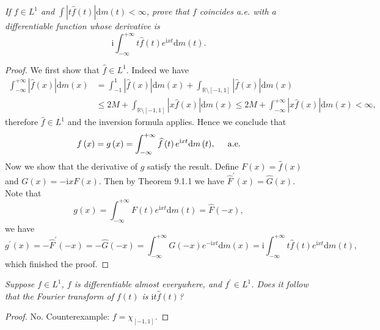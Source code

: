 \begin{problem}\em
If $f\in L^1$ and $\int|t\widehat{f}(t)|\mathrm{d}m(t)<\infty$, prove that $f$ coincides a.e. with a differentiable function whose derivative is 
$$\mathrm{i}\int_{-\infty}^{+\infty}t\widehat{f}(t)e^{\mathrm{i}xt}\mathrm{d}m(t).$$
\end{problem}
\begin{proof}
We first show that $\widehat{f}\in L^1$. Indeed we have 
$$
\begin{aligned}
\int_{-\infty}^{+\infty}{\left| \widehat{f}\left( x \right) \right|\mathrm{d}m\left( x \right)}&=\int_{-1}^1{\left| \widehat{f}\left( x \right) \right|\mathrm{d}m\left( x \right)}+\int_{\mathbb{R} \setminus \left[ -1,1 \right]}{\left| \widehat{f}\left( x \right) \right|\mathrm{d}m\left( x \right)}
\\
&\le 2M+\int_{\mathbb{R} \setminus \left[ -1,1 \right]}{\left| x\widehat{f}\left( x \right) \right|\mathrm{d}m\left( x \right)}\le 2M+\int_{-\infty}^{+\infty}{\left| x\widehat{f}\left( x \right) \right|\mathrm{d}m\left( x \right)}<\infty ,
\end{aligned}
$$
therefore $\widehat{f}\in L^1$ and the inversion formula applies. Hence we conclude that 
$$
f\left( x \right) =g\left( x \right) =\int_{-\infty}^{+\infty}{\widehat{f}\left( t \right) e^{\mathrm{i}xt}\mathrm{d}m\left( t \right)},\hspace{0.5cm}\mathrm{a}.\mathrm{e}.
$$
Now we show that the derivative of $g$ satisfy the result. Define $F(x)=\widehat{f}(x)$ and $G(x)=-\mathrm{i}xF(x)$. Then by Theorem 9.1.1 we have $\widehat{F}^\prime(x)=\widehat{G}(x)$. Note that 
$$
g\left( x \right) =\int_{-\infty}^{+\infty}{F\left( t \right) e^{\mathrm{i}xt}\mathrm{d}m\left( t \right)}=\widehat{F}\left( -x \right) ,
$$
we have 
$$
g^{\prime}\left( x \right) =-\widehat{F}^{\prime}\left( -x \right) =-\widehat{G}\left( -x \right) =\int_{-\infty}^{+\infty}{G\left( -x \right) e^{-\mathrm{i}xt}\mathrm{d}m\left( x \right)}=\mathrm{i}\int_{-\infty}^{+\infty}{t\widehat{f}\left( t \right) e^{\mathrm{i}xt}\mathrm{d}m\left( t \right)},
$$
which finished the proof.
\end{proof}
\begin{problem}\em
Suppose $f\in L^1$, $f$ is differentiable almost everywhere, and $f^\prime\in L^1$. Does it follow that the Fourier transform of $f(t)$ is $\mathrm{i}t\widehat{f}(t)$?
\end{problem}
\begin{proof}
No. Counterexample: $f=\chi_{[-1,1]}$.
\end{proof}
